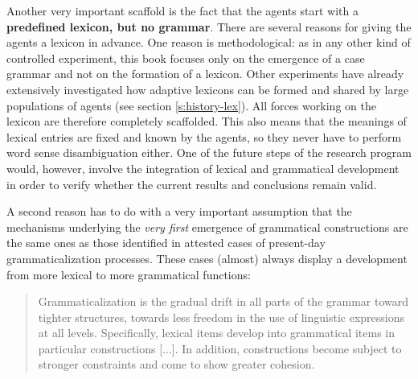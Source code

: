 Another very important scaffold is the fact that the agents start with a {\bfseries predefined lexicon, but no grammar}. There are several reasons for giving the agents a lexicon in advance. One reason is methodological: as in any other kind of controlled experiment, this book focuses only on the emergence of a case grammar and not on the formation of a lexicon. Other experiments have already extensively investigated how adaptive lexicons can be formed and shared by large populations of agents (see section \ref{s:history-lex}). All forces working on the lexicon are therefore completely scaffolded. This also means that the meanings of lexical entries are fixed and known by the agents, so they never have to perform word sense disambiguation either. One of the future steps of the research program would, however, involve the integration of lexical and grammatical development in order to verify whether the current results and conclusions remain valid.

A second reason has to do with a very important assumption that the mechanisms underlying the {\em very first} emergence of grammatical constructions are the same ones as those identified in attested cases of present-day grammaticalization processes. These cases (almost) always display a development from more lexical to more grammatical functions:

\begin{quote}
Grammaticalization is the gradual drift in all parts of the grammar toward tighter structures, towards less freedom in the use of linguistic expressions at all levels. Specifically, lexical items develop into grammatical items in particular constructions [...]. In addition, constructions become subject to stronger constraints and come to show greater cohesion. \\ \citet[318]{haspelmath98does}
\end{quote}

